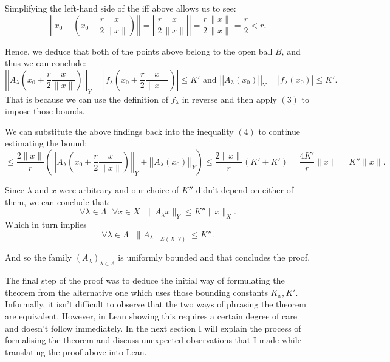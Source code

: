 \documentclass[11pt]{article}
\newcommand\sep{\text{ }}
\begin{document}
Simplifying the left-hand side of the iff above allows us to see:
\[
\left|\left|x_0 - \left(x_0 + \frac{r}{2}\frac{x}{\|x\|}   \right) \right|\right| =
\left|\left| \frac{r}{2}\frac{x}{\|x\|}\right|\right| = \frac{r}{2} \frac{\|x\|}{\|x\|} = \frac{r}{2}  < r
.\]

Hence, we deduce that both of the points above belong to the open ball $B$, and
thus we can conclude:
\[
  \left|\left| A_\lambda\left( x_0 + \frac{r}{2}\frac{x}{\|x\|} \right)\right|\right|_Y = \left| f_\lambda\left( x_0 + \frac{r}{2}\frac{x}{\|x\|} \right)\right| \le K' \text{ and }
\left|\left| A_\lambda(x_0)  \right|\right|_Y = \left| f_\lambda(x_0)  \right| \le K'
.\]
That is because we can use the definition of $f_\lambda$ in reverse and then apply
 $(3)$ to impose those bounds.

 We can substitute the above findings back into the inequality $(4)$ to continue
 estimating the bound:
 \[
 \le \frac{2\|x\|}{r} \left( \left|\left| A_\lambda\left( x_0 + \frac{r}{2}\frac{x}{\|x\|} \right)
 \right|\right|_Y + \left|\left| A_\lambda(x_0)  \right|\right|_Y \right)
 \le \frac{2\|x\|}{r} \left( K' + K'\right) = \frac{4K'}{r}\|x\| = K''\|x\|
 .\]

 Since $\lambda$ and  $x$ were arbitrary and our choice of $K''$ didn't depend on either
 of them, we can conclude that:
\[
   \forall \lambda \in \Lambda \sep \forall x \in X \sep \|A_\lambda x\|_Y \le K'' \|x\|_X
.\]
Which in turn implies
\[
\forall \lambda \in \Lambda \sep \|A_\lambda\|_{\mathcal{L}\left( X, Y \right)}  \le K''.\]

And so the family $\left( A_\lambda \right)_{\lambda \in \Lambda} $ is uniformly
bounded and that concludes the proof. \hfill \blacksquare

The final step of the proof was to deduce the initial way of formulating the theorem
from the alternative one which uses those bounding constants $K_x, K'$. Informally,
it isn't difficult to observe that the two ways of phrasing the theorem are equivalent.
However, in Lean showing this requires a certain degree of care and doesn't follow
immediately. In the next section I will explain the process of formalising the
theorem and discuss unexpected observations that I made while translating the proof
above into Lean.
\end{document}
